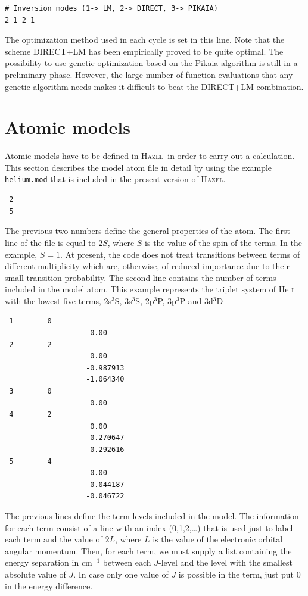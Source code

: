 \documentclass[12pt]{article}
\def\H{\textsc{Hazel}}
\begin{document}
\begin{verbatim}
# Inversion modes (1-> LM, 2-> DIRECT, 3-> PIKAIA)
2 1 2 1
\end{verbatim}
The optimization method used in each cycle is set in this line. Note that the scheme DIRECT+LM has been
empirically proved to be quite optimal. The possibility to use genetic optimization based on the Pikaia
algorithm is still in a preliminary phase. However, the large number of function evaluations that any genetic
algorithm needs makes it difficult to beat the DIRECT+LM combination.


\section{Atomic models}
\label{sec:atomic_model}
Atomic models have to be defined in \H\ in order to carry out a calculation. This
section describes the model atom file in detail by using the example \texttt{helium.mod}
that is included in the present version of \H.

\begin{verbatim}
 2
 5
\end{verbatim}
The previous two numbers define the general properties of the atom.
The first line of the file is equal to $2S$, where $S$ is the value of the spin of the
terms. In the example, $S=1$. At present, the code does not treat transitions between terms of different multiplicity which are,
otherwise, of reduced importance due to their small transition probability. The second
line contains the number of terms included in the model atom. This example represents
the triplet system of He \textsc{i} with the lowest five terms, 2s$^3$S, 3s$^3$S, 2p$^3$P, 3p$^3$P and 3d$^3$D

\begin{verbatim}
 1        0
                    0.00
 2        2
                    0.00
                   -0.987913
                   -1.064340
 3        0
                    0.00
 4        2
                    0.00
                   -0.270647
                   -0.292616
 5        4
                    0.00
                   -0.044187
                   -0.046722
\end{verbatim}
The previous lines define the term levels included in the model. The information for each term
consist of a line with an index (0,1,2,\ldots) that is used just to label each term and
the value of $2L$, where $L$ is the value of the electronic orbital angular momentum. Then, for 
each term, we must supply a list containing the energy separation in cm$^{-1}$ between each $J$-level
and the level with the smallest absolute value of $J$. In case only one value of $J$ is possible
in the term, just put 0 in the energy difference.
\end{document}
